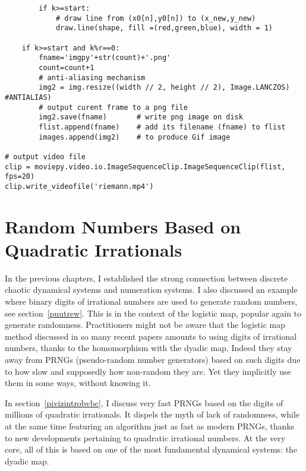 \documentclass[oneside,10pt]{book}
\newcommand\Chapter[2]{
  \chapter[#1]{#1\\[2ex]\Large\itshape#2}
}
\begin{document}
\begin{lstlisting}
        if k>=start:
            # draw line from (x0[n],y0[n]) to (x_new,y_new)
            draw.line(shape, fill =(red,green,blue), width = 1)

    if k>=start and k%r==0:
        fname='imgpy'+str(count)+'.png'
        count=count+1
        # anti-aliasing mechanism
        img2 = img.resize((width // 2, height // 2), Image.LANCZOS) #ANTIALIAS)
        # output curent frame to a png file
        img2.save(fname)       # write png image on disk
        flist.append(fname)    # add its filename (fname) to flist
        images.append(img2)    # to produce Gif image

# output video file
clip = moviepy.video.io.ImageSequenceClip.ImageSequenceClip(flist, fps=20) 
clip.write_videofile('riemann.mp4')
\end{lstlisting}






\Chapter{Random Numbers Based on Quadratic Irrationals}{}\label{chapterPRNG}


In the previous chapters, I established the strong connection between discrete chaotic dynamical systems and numeration systems. 
I also discussed an example where binary digits of irrational numbers are used  to generate random numbers, see
 section~\ref{puutrew}. This is in the context of the logistic map,  popular again to generate randomness. Practitioners might not be aware that the logistic map method discussed in so many recent papers amounts to using digits of irrational numbers,
 thanks to the homomorphism with the dyadic map. Indeed they stay away from PRNGs (pseudo-random number generators) based on such digits due to how slow and supposedly how non-random they are. Yet they implicitly use them in some ways, without knowing it. 

In section~\ref{pivizintrobvbc}, 
 I discuss very fast PRNGs based on the digits of millions of quadratic irrationals. It dispels the myth of lack of randomness, while at the same time featuring an algorithm just as fast as modern PRNGs, thanks to new developments pertaining to quadratic irrational numbers. At the very core, all of this is based on one of the most fundamental dynamical systems: the dyadic map. 
\end{document}
